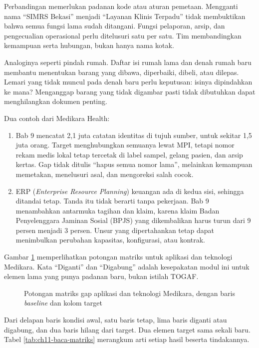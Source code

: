 Perbandingan memerlukan padanan kode atau aturan pemetaan. Mengganti nama ``SIMRS
Bekasi'' menjadi ``Layanan Klinis Terpadu'' tidak membuktikan bahwa semua fungsi
lama sudah ditangani. Fungsi pelaporan, arsip, dan pengecualian operasional perlu
ditelusuri satu per satu. Tim membandingkan kemampuan serta hubungan, bukan hanya
nama kotak.

Analoginya seperti pindah rumah. Daftar isi rumah lama dan denah rumah baru membantu
menentukan barang yang dibawa, diperbaiki, dibeli, atau dilepas. Lemari yang tidak
muncul pada denah baru perlu keputusan: isinya dipindahkan ke mana? Menganggap
barang yang tidak digambar pasti tidak dibutuhkan dapat menghilangkan dokumen
penting.

Dua contoh dari Medikara Health:
\begin{enumerate}
  \item Bab 9 mencatat 2,1 juta catatan identitas di tujuh sumber, untuk sekitar
        1,5 juta orang. Target menghubungkan semuanya lewat MPI, tetapi nomor rekam
        medis lokal tetap tercetak di label sampel, gelang pasien, dan arsip kertas.
        Gap tidak ditulis ``hapus semua nomor lama'', melainkan kemampuan memetakan,
        menelusuri asal, dan mengoreksi salah cocok.
  \item ERP (\textit{Enterprise Resource Planning}) keuangan ada di kedua sisi,
        sehingga ditandai tetap. Tanda itu tidak berarti tanpa pekerjaan. Bab 9
        menambahkan antarmuka tagihan dan klaim, karena klaim Badan Penyelenggara
        Jaminan Sosial (BPJS) yang dikembalikan harus turun dari 9 persen menjadi 3
        persen. Unsur yang dipertahankan tetap dapat menimbulkan perubahan kapasitas,
        konfigurasi, atau kontrak.
\end{enumerate}

Gambar \ref{fig:ch11-matriks-gap} memperlihatkan potongan matriks untuk aplikasi dan
teknologi Medikara. Kata ``Diganti'' dan ``Digabung'' adalah kesepakatan modul ini
untuk elemen lama yang punya padanan baru, bukan istilah TOGAF.

\begin{figure}[!htb]
  \centering
  
  \caption{Potongan matriks gap aplikasi dan teknologi Medikara, dengan baris
           \textit{baseline} dan kolom target}
  \label{fig:ch11-matriks-gap}
\end{figure}

Dari delapan baris kondisi awal, satu baris tetap, lima baris diganti atau digabung,
dan dua baris hilang dari target. Dua elemen target sama sekali baru. Tabel
\ref{tab:ch11-baca-matriks} merangkum arti setiap hasil beserta tindakannya.

